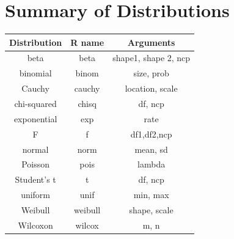 \documentclass[a4paper,12pt]{article}
\begin{document}
\section{Summary of Distributions}
\begin{center}
\begin{tabular}{|c|c|c|}
\hline
Distribution &	R name & Arguments\\ \hline
beta &	beta &	shape1, shape 2, ncp\\
binomial &	binom	& size, prob\\
Cauchy	& cauchy	& location, scale\\
chi-squared &	chisq &	df, ncp\\
exponential	& exp &	rate\\
F	& f	& df1,df2,ncp\\
normal &	norm &	mean, sd\\
Poisson&	pois & 	lambda\\
Student's t	& t&	df, ncp\\
uniform	& unif &	min, max\\
Weibull	& weibull & shape, scale\\
Wilcoxon &	wilcox &	m, n\\ 
\hline 
\end{tabular}
\end{center}
 
 
\end{document}
